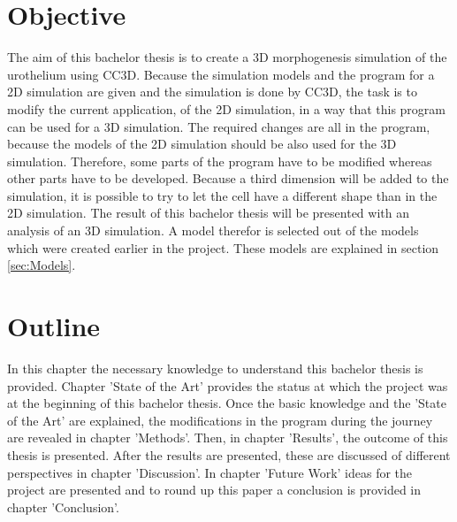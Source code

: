 \section{Objective}
The aim of this bachelor thesis is to create a 3D morphogenesis simulation of the urothelium using \ac{CC3D}. Because the simulation models and the program for a 2D simulation are given and the simulation is done by \ac{CC3D}, the task is to modify the current application, of the 2D simulation, in a way that this program can be used for a 3D simulation. \newline
The required changes are all in the program, because the models of the 2D simulation should be also used for the 3D simulation.
Therefore, some parts of the program have to be modified whereas other parts have to be developed. Because a third dimension will be added to the simulation, it is possible to try to let the cell have a different shape than in the 2D simulation. 
The result of this bachelor thesis will be presented with an analysis of an 3D simulation. A model therefor is selected out of the models which were created earlier in the project. These models are explained in section \ref{sec:Models}.


\section{Outline}
In this chapter the necessary knowledge to understand this bachelor thesis is provided. Chapter 'State of the Art' provides the status at which the project was at the beginning of this bachelor thesis. Once the basic knowledge and the 'State of the Art' are explained, the modifications in the program during the journey are revealed in chapter 'Methods'. Then, in chapter 'Results', the outcome of this thesis is presented. After the results are presented, these are discussed of different perspectives in chapter 'Discussion'. In chapter 'Future Work' ideas for the project are presented and to round up this paper a conclusion is provided in chapter 'Conclusion'.